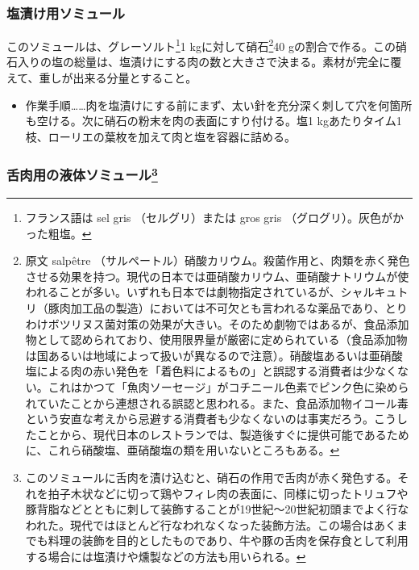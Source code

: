 
 
\begin{recette}
\hypertarget{saumure-au-sel}{%
\subsubsection{塩漬け用ソミュール}\label{saumure-au-sel}}



このソミュールは、グレーソルト\footnote{フランス語は sel gris
  （セルグリ）または gros gris （グログリ）。灰色がかった粗塩。}1
kgに対して硝石\footnote{原文 salpêtre
  （サルペートル）硝酸カリウム。殺菌作用と、肉類を赤く発色させる効果を持つ。現代の日本では亜硝酸カリウム、亜硝酸ナトリウムが使われることが多い。いずれも日本では劇物指定されているが、シャルキュトリ（豚肉加工品の製造）においては不可欠とも言われるな薬品であり、とりわけボツリヌス菌対策の効果が大きい。そのため劇物ではあるが、食品添加物として認められており、使用限界量が厳密に定められている（食品添加物は国あるいは地域によって扱いが異なるので注意）。硝酸塩あるいは亜硝酸塩による肉の赤い発色を「着色料によるもの」と誤認する消費者は少なくない。これはかつて「魚肉ソーセージ」がコチニール色素でピンク色に染められていたことから連想される誤認と思われる。また、食品添加物イコール毒という安直な考えから忌避する消費者も少なくないのは事実だろう。こうしたことから、現代日本のレストランでは、製造後すぐに提供可能であるために、これら硝酸塩、亜硝酸塩の類を用いないところもある。}40
gの割合で作る。この硝石入りの塩の総量は、塩漬けにする肉の数と大きさで決まる。素材が完全に覆えて、重しが出来る分量とすること。

\begin{itemize}
\tightlist
\item
  作業手順\ldots{}\ldots{}肉を塩漬けにする前にまず、太い針を充分深く刺して穴を何箇所も空ける。次に硝石の粉末を肉の表面にすり付ける。塩1
  kgあたりタイム1枝、ローリエの葉\undemi{}枚を加えて肉と塩を容器に詰める。
\end{itemize}

\hypertarget{saumure-liquide-pour-langues}{%
\subsubsection[舌肉用の液体ソミュール]{\texorpdfstring{舌肉用の液体ソミュール\footnote{このソミュールに舌肉を漬け込むと、硝石の作用で舌肉が赤く発色する。それを拍子木状などに切って鶏やフィレ肉の表面に、同様に切ったトリュフや豚背脂などとともに刺して装飾することが19世紀〜20世紀初頭までよく行なわれた。現代ではほとんど行なわれなくなった装飾方法。この場合はあくまでも料理の装飾を目的としたものであり、牛や豚の舌肉を保存食として利用する場合には塩漬けや燻製などの方法も用いられる。}}{舌肉用の液体ソミュール}}\label{saumure-liquide-pour-langues}}


\end{recette}
